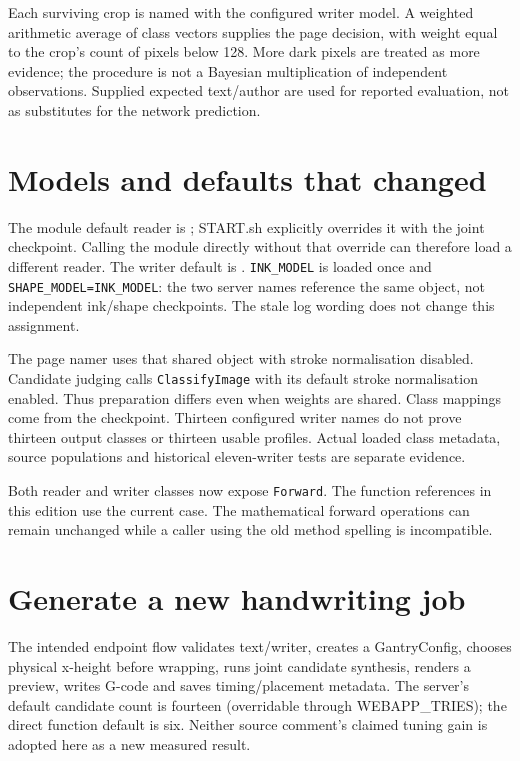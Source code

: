 Each surviving crop is named with the configured writer model. A weighted
arithmetic average of class vectors supplies the page decision, with weight
equal to the crop's count of pixels below 128. More dark pixels are treated
as more evidence; the procedure is not a Bayesian multiplication of
independent observations. Supplied expected text/author are used for reported
evaluation, not as substitutes for the network prediction.

\section{Models and defaults that changed}
The module default reader is
; START.sh explicitly overrides
it with the joint checkpoint. Calling the module directly without that
override can therefore load a different reader. The writer default is
.
\texttt{INK\_MODEL} is loaded once and \texttt{SHAPE\_MODEL=INK\_MODEL}:
the two server names reference the same object, not independent ink/shape
checkpoints. The stale log wording does not change this assignment.

The page namer uses that shared object with stroke normalisation disabled.
Candidate judging calls \texttt{ClassifyImage} with its default stroke
normalisation enabled. Thus preparation differs even when weights are shared.
Class mappings come from the checkpoint. Thirteen configured writer names do
not prove thirteen output classes or thirteen usable profiles. Actual loaded
class metadata, source populations and historical eleven-writer tests are
separate evidence.

Both reader and writer classes now expose \texttt{Forward}. The function
references in this edition use the current case. The mathematical forward
operations can remain unchanged while a caller using the old method spelling
is incompatible.

\section{Generate a new handwriting job}
The intended endpoint flow validates text/writer, creates a GantryConfig,
chooses physical x-height before wrapping, runs joint candidate synthesis,
renders a preview, writes G-code and saves timing/placement metadata.
The server's default candidate count is fourteen (overridable through
WEBAPP\_TRIES); the direct function default is six. Neither source comment's
claimed tuning gain is adopted here as a new measured result.

